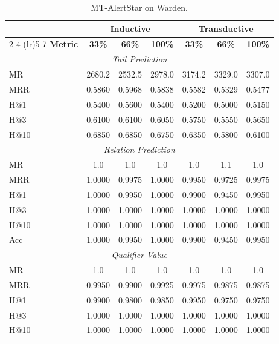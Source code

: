 \documentclass[10pt,journal,compsoc]{IEEEtran}
\begin{document}
\begin{table}[ht]
\tiny
\centering
\caption{MT-AlertStar on Warden.}
\label{tab:multitask_alertstar_full_warden}
\begin{tabular}{l ccc ccc}
\toprule
\multicolumn{1}{c}{} & \multicolumn{3}{c}{\textbf{Inductive}} & \multicolumn{3}{c}{\textbf{Transductive}} \\
\cmidrule(lr){2-4} \cmidrule(lr){5-7}
\textbf{Metric} & \textbf{33\%} & \textbf{66\%} & \textbf{100\%} & \textbf{33\%} & \textbf{66\%} & \textbf{100\%} \\
\midrule
\multicolumn{7}{c}{\textit{Tail Prediction}} \\
\midrule
MR  & 2680.2 & 2532.5 & 2978.0 & 3174.2 & 3329.0 & 3307.0 \\
MRR & 0.5860 & 0.5968 & 0.5838 & 0.5582 & 0.5329 & 0.5477 \\
H@1 & 0.5400 & 0.5600 & 0.5400 & 0.5200 & 0.5000 & 0.5150 \\
H@3 & 0.6100 & 0.6100 & 0.6050 & 0.5750 & 0.5550 & 0.5650 \\
H@10& 0.6850 & 0.6850 & 0.6750 & 0.6350 & 0.5800 & 0.6100 \\
\midrule
\multicolumn{7}{c}{\textit{Relation Prediction}} \\
\midrule
MR  & 1.0 & 1.0    & 1.0    & 1.0 & 1.1 & 1.0    \\
MRR & 1.0000 & 0.9975 & 1.0000 & 0.9950 & 0.9725 & 0.9975 \\
H@1 & 1.0000 & 0.9950 & 1.0000 & 0.9900 & 0.9450 & 0.9950 \\
H@3 & 1.0000 & 1.0000 & 1.0000 & 1.0000 & 1.0000 & 1.0000 \\
H@10& 1.0000 & 1.0000 & 1.0000 & 1.0000 & 1.0000 & 1.0000 \\
Acc & 1.0000 & 0.9950 & 1.0000 & 0.9900 & 0.9450 & 0.9950 \\
\midrule
\multicolumn{7}{c}{\textit{Qualifier Value}} \\
\midrule
MR  & 1.0 & 1.0    & 1.0    & 1.0 & 1.0 & 1.0    \\
MRR & 0.9950 & 0.9900 & 0.9925 & 0.9975 & 0.9875 & 0.9875 \\
H@1 & 0.9900 & 0.9800 & 0.9850 & 0.9950 & 0.9750 & 0.9750 \\
H@3 & 1.0000 & 1.0000 & 1.0000 & 1.0000 & 1.0000 & 1.0000 \\
H@10& 1.0000 & 1.0000 & 1.0000 & 1.0000 & 1.0000 & 1.0000 \\
\bottomrule
\end{tabular}
\end{table}
\end{document}
